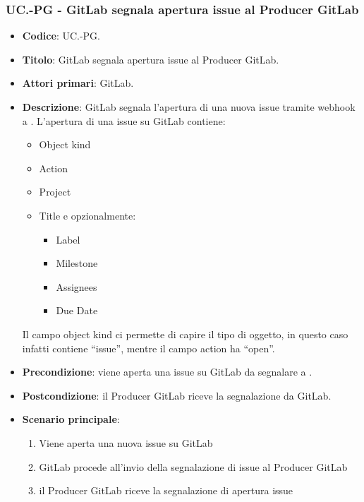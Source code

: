 \subsubsection{UC\theuccount.\thesubuccount-PG - GitLab segnala apertura issue al Producer GitLab}
\begin{itemize}
    \item \textbf{Codice}: UC\theuccount.\thesubuccount-PG.
    \item \textbf{Titolo}: GitLab segnala apertura issue al Producer GitLab.
    \item \textbf{Attori primari}: GitLab.
    \item \textbf{Descrizione}: GitLab segnala l'apertura di una nuova issue tramite webhook a \progetto.
    L'apertura di una issue su GitLab contiene:
    \begin{itemize}
        \item Object kind
        \item Action
        \item Project
        \item Title e opzionalmente:
        \begin{itemize}
            \item Label
            \item Milestone
            \item Assignees
            \item Due Date
        \end{itemize}
    \end{itemize}
    Il campo object kind ci permette di capire il tipo di oggetto, in questo caso infatti contiene ``issue'', mentre il campo action ha ``open''.
    \item \textbf{Precondizione}: viene aperta una issue su GitLab da
    segnalare a \progetto.
    \item \textbf{Postcondizione}: il Producer GitLab riceve la segnalazione da GitLab.
    \item \textbf{Scenario principale}:
    \begin{enumerate}
        \item Viene aperta una nuova issue su GitLab
        \item GitLab procede all'invio della segnalazione di issue al Producer GitLab
        \item il Producer GitLab riceve la segnalazione di apertura issue
    \end{enumerate}

\end{itemize}


